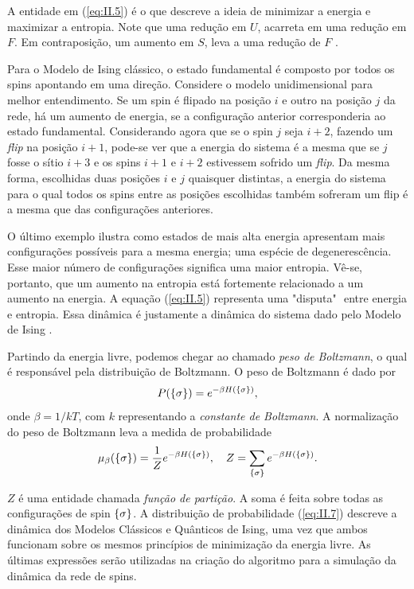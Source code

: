 A entidade em (\ref{eq:II.5}) é o que descreve a ideia de minimizar a energia e maximizar a entropia. Note que uma redução em $U$, acarreta em uma redução em $F$. Em contraposição, um aumento em $S$, leva a uma redução de $F$ \cite{Schroeder}. 

Para o Modelo de Ising clássico, o estado fundamental é composto por todos os spins apontando em uma direção. Considere o modelo unidimensional para melhor entendimento. Se um spin é flipado na posição $i$ e outro na posição $j$ da rede, há um aumento de energia, se a configuração anterior corresponderia ao estado fundamental. Considerando agora que se o spin $j$ seja $i+2$, fazendo um \textit{flip} na posição $i+1$, pode-se ver que a energia do sistema é a mesma que se $j$ fosse o sítio $i+3$ e os spins $i+1$ e $i+2$ estivessem sofrido um \textit{flip}. Da mesma forma, escolhidas duas posições $i$ e $j$ quaisquer distintas, a energia do sistema para o qual todos os spins entre as posições escolhidas também sofreram um flip é a mesma que das configurações  anteriores.

O último exemplo  ilustra como estados de mais alta energia apresentam mais configurações possíveis para a mesma energia; uma espécie de degenerescência. Esse maior número de configurações significa uma maior entropia. Vê-se, portanto, que um aumento na entropia está fortemente relacionado a um aumento na energia. A equação (\ref{eq:II.5}) representa uma "disputa" $ $ entre energia e entropia. Essa dinâmica é justamente a dinâmica do sistema dado pelo Modelo de Ising \cite{Huang, Baxter}. 

\vspace*{1.5mm}
 Partindo da energia livre, podemos chegar ao chamado \textit{peso de Boltzmann}, o qual é responsável pela distribuição de Boltzmann. O peso de Boltzmann é dado por
\begin{equation}
	P (\{ \sigma \}) = e^{-\beta H(\{ \sigma \})}, 
	\label{eq:II.6}
\end{equation}
onde $\beta = 1/kT$, com $k$ representando a \textit{constante de Boltzmann}. A normalização do peso de Boltzmann leva a medida de probabilidade 
\begin{equation}
	\mu_\beta (\sconf) = \frac{1}{Z} e^{-\beta H(\sconf)} \qc Z = \sum_{\sconf} e^{-\beta H(\sconf)}.
	\label{eq:II.7}
\end{equation}

$Z$ é uma entidade chamada \textit{função de partição}. A soma é feita sobre todas as configurações de spin $\{ \sigma \}$. A distribuição de probabilidade (\ref{eq:II.7}) descreve a dinâmica dos Modelos Clássicos e Quânticos de Ising, uma vez que ambos funcionam sobre os mesmos princípios de minimização da energia livre. As últimas expressões serão utilizadas na criação do algoritmo para a simulação da dinâmica da rede de spins.

